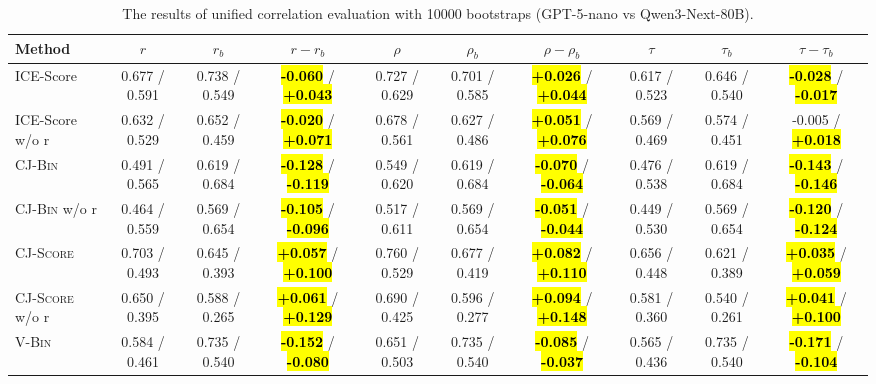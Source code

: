 \begin{table}[t]
    \centering
    \scriptsize
    \setlength{\tabcolsep}{3.5pt}
    \caption{The results of unified correlation evaluation with 10000 bootstraps (GPT-5-nano vs Qwen3-Next-80B).}
    \label{tab:unified-settings-models}
    \begin{tabular}{@{}
        l|ccc|ccc|ccc@{}}
        \toprule
        Method & $r$ & $r_b$ & $r-r_b$ & $\rho$ & $\rho_b$ & $\rho-\rho_b$ & $\tau$ & $\tau_b$ & $\tau-\tau_b$ \\
        \midrule
        \midrule
        ICE-Score               & 0.677 / 0.591   & 0.738 / 0.549   & \hl{\textbf{-0.060}} / \hl{\textbf{+0.043}} & 0.727 / 0.629   & 0.701 / 0.585   & \hl{\textbf{+0.026}} / \hl{\textbf{+0.044}} & 0.617 / 0.523   & 0.646 / 0.540   & \hl{\textbf{-0.028}} / \hl{\textbf{-0.017}} \\
        ICE-Score w/o r         & 0.632 / 0.529   & 0.652 / 0.459   & \hl{\textbf{-0.020}} / \hl{\textbf{+0.071}} & 0.678 / 0.561   & 0.627 / 0.486   & \hl{\textbf{+0.051}} / \hl{\textbf{+0.076}} & 0.569 / 0.469   & 0.574 / 0.451   & -0.005 / \hl{\textbf{+0.018}}       \\
        \midrule
        \textsc{CJ-Bin}         & 0.491 / 0.565   & 0.619 / 0.684   & \hl{\textbf{-0.128}} / \hl{\textbf{-0.119}} & 0.549 / 0.620   & 0.619 / 0.684   & \hl{\textbf{-0.070}} / \hl{\textbf{-0.064}} & 0.476 / 0.538   & 0.619 / 0.684   & \hl{\textbf{-0.143}} / \hl{\textbf{-0.146}} \\
        \textsc{CJ-Bin} w/o r   & 0.464 / 0.559   & 0.569 / 0.654   & \hl{\textbf{-0.105}} / \hl{\textbf{-0.096}} & 0.517 / 0.611   & 0.569 / 0.654   & \hl{\textbf{-0.051}} / \hl{\textbf{-0.044}} & 0.449 / 0.530   & 0.569 / 0.654   & \hl{\textbf{-0.120}} / \hl{\textbf{-0.124}} \\
        \textsc{CJ-Score}       & 0.703 / 0.493   & 0.645 / 0.393   & \hl{\textbf{+0.057}} / \hl{\textbf{+0.100}} & 0.760 / 0.529   & 0.677 / 0.419   & \hl{\textbf{+0.082}} / \hl{\textbf{+0.110}} & 0.656 / 0.448   & 0.621 / 0.389   & \hl{\textbf{+0.035}} / \hl{\textbf{+0.059}} \\
        \textsc{CJ-Score} w/o r & 0.650 / 0.395   & 0.588 / 0.265   & \hl{\textbf{+0.061}} / \hl{\textbf{+0.129}} & 0.690 / 0.425   & 0.596 / 0.277   & \hl{\textbf{+0.094}} / \hl{\textbf{+0.148}} & 0.581 / 0.360   & 0.540 / 0.261   & \hl{\textbf{+0.041}} / \hl{\textbf{+0.100}} \\
        \midrule
        \textsc{V-Bin}          & 0.584 / 0.461   & 0.735 / 0.540   & \hl{\textbf{-0.152}} / \hl{\textbf{-0.080}} & 0.651 / 0.503   & 0.735 / 0.540   & \hl{\textbf{-0.085}} / \hl{\textbf{-0.037}} & 0.565 / 0.436   & 0.735 / 0.540   & \hl{\textbf{-0.171}} / \hl{\textbf{-0.104}} \\

\end{tabular}
\end{table}
